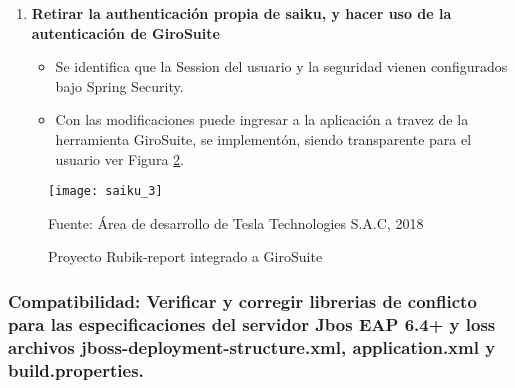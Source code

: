 \begin{spacing}{1.5}
\begin{enumerate}
\begin{itemize}
					\begin{figure}[H]
						\centering
						\texttt{[image: saiku\_2]}
						\caption {\centering \small{Proyecto Rubik-report, c\'{o}digo fuente}} \label{figure:chaperIII_5}
						\small {Fuente: \'{A}rea de desarrollo de Tesla Technologies S.A.C, 2018}
					\end{figure}
					
					\item El equipo recomienda reducir el n\'{u}mero de m\'{o}dulos pues 2 de ellos se encuentran ligados directamente como plugins de la Suite Pentaho Analytics.
					\item El equipo recomienda quitar todo aquello que no sea parte de la funcionalidad core y refactorizar el m\'{o}dulo rubik-query.
				\end{itemize}	
			
			\item \textbf{Retirar la authenticación propia de saiku, y hacer uso de la autenticación de GiroSuite}
				\begin{itemize}
					\item Se identifica que la Session  del usuario y la seguridad vienen configurados bajo Spring Security.
					\item Con las modificaciones puede ingresar a la aplicaci\'{o}n a travez de la herramienta GiroSuite, se implement\'{o}n, siendo transparente para el usuario ver Figura \ref{figure:chaperIII_6}.
				\end{itemize}
		\end{enumerate}

		
		
		
		\begin{figure}[H]
			\centering
			\texttt{[image: saiku\_3]}
			\caption {\centering \small{Proyecto Rubik-report integrado a GiroSuite}} \label{figure:chaperIII_6}
			\small {Fuente: \'{A}rea de desarrollo de Tesla Technologies S.A.C, 2018}
		\end{figure}	
			
		\subsubsection{Compatibilidad: Verificar y corregir librerias de conflicto para las especificaciones del servidor Jbos EAP 6.4+ y loss archivos jboss-deployment-structure.xml, application.xml y build.properties.}
		

\end{spacing}
